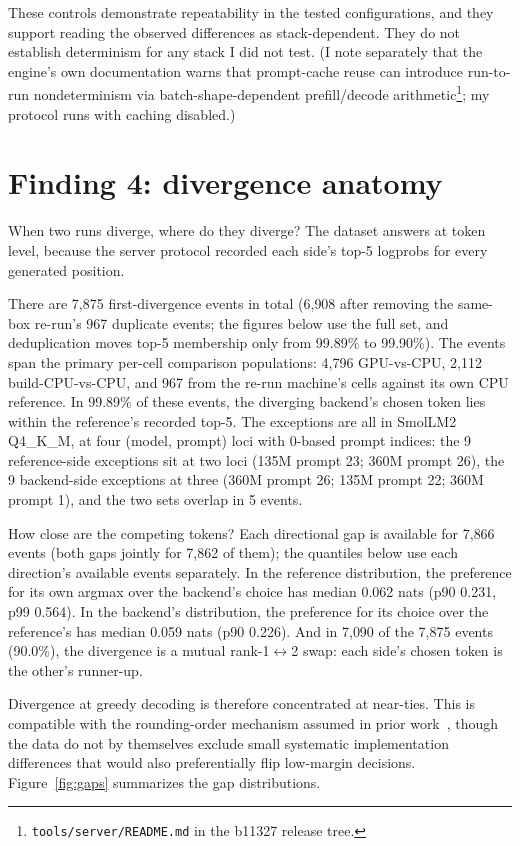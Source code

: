 \documentclass[11pt]{article}
\begin{document}
These controls demonstrate repeatability in the tested configurations,
and they support reading the observed differences as stack-dependent.
They do not establish determinism for any stack I did not test. (I
note separately that the engine's own documentation warns that
prompt-cache reuse can introduce run-to-run nondeterminism via
batch-shape-dependent prefill/decode
arithmetic\footnote{\texttt{tools/server/README.md} in the b11327
release tree.}; my protocol runs with caching disabled.)

\section{Finding 4: divergence anatomy}\label{sec:mechanism}

When two runs diverge, where do they diverge? The dataset answers at
token level, because the server protocol recorded each side's top-5
logprobs for every generated position.

There are 7{,}875 first-divergence events in total (6{,}908 after
removing the same-box re-run's 967 duplicate events; the figures below
use the full set, and deduplication moves top-5 membership only from
99.89\% to 99.90\%). The events span the primary per-cell comparison
populations: 4{,}796 GPU-vs-CPU, 2{,}112 build-CPU-vs-CPU, and 967
from the re-run machine's cells against its own CPU reference. In
99.89\% of these events, the diverging backend's chosen token lies
within the reference's recorded top-5. The exceptions are all in
SmolLM2 Q4\_K\_M, at four (model, prompt) loci with 0-based prompt
indices: the 9 reference-side exceptions sit at two loci (135M prompt
23; 360M prompt 26), the 9 backend-side exceptions at three (360M
prompt 26; 135M prompt 22; 360M prompt 1), and the two sets overlap in
5 events.

How close are the competing tokens? Each directional gap is available
for 7{,}866 events (both gaps jointly for 7{,}862 of them); the
quantiles below use each direction's available events separately. In
the reference distribution, the preference for its own argmax over the
backend's choice has median 0.062 nats (p90 0.231, p99 0.564). In the
backend's distribution, the preference for its choice over the
reference's has median 0.059 nats (p90 0.226). And in 7{,}090 of the
7{,}875 events (90.0\%), the divergence is a mutual rank-1$\leftrightarrow$2
swap: each side's chosen token is the other's runner-up.

Divergence at greedy decoding is therefore concentrated at near-ties.
This is compatible with the rounding-order mechanism assumed in prior
work~\cite{du2026}, though the data do not by themselves exclude small
systematic implementation differences that would also preferentially
flip low-margin decisions. Figure~\ref{fig:gaps} summarizes the gap
distributions.
\end{document}
